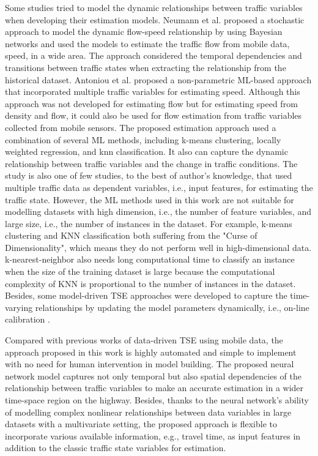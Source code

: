 \documentclass[english]{kththesis}
\begin{document}
Some studies tried to model the dynamic relationships between traffic variables when developing their estimation models. Neumann et al. \cite{neumann_bayesian} proposed a stochastic approach to model the dynamic flow-speed relationship by using Bayesian networks and used the models to estimate the traffic flow from mobile data, speed, in a wide area. The approach considered the temporal dependencies and transitions between traffic states when extracting the relationship from the historical dataset. Antoniou et al. \cite{antoniou_ml_estimation} proposed a non-parametric ML-based approach that incorporated multiple traffic variables for estimating speed. Although this approach was not developed for estimating flow but for estimating speed from density and flow, it could also be used for flow estimation from traffic variables collected from mobile sensors. The proposed estimation approach used a combination of several ML methods, including k-means clustering, locally weighted regression, and \gls{knn} classification. It also can capture the dynamic relationship between traffic variables and the change in traffic conditions. The study is also one of few studies, to the best of author's knowledge, that used multiple traffic data as dependent variables, i.e., input features, for estimating the traffic state. However, the ML methods used in this work are not suitable for modelling datasets with high dimension, i.e., the number of feature variables, and large size, i.e., the number of instances in the dataset. For example, k-means clustering and KNN classification both suffering from the "Curse of Dimensionality", which means they do not perform well in high-dimensional data. k-nearest-neighbor also needs long computational time to classify an instance when the size of the training dataset is large because the computational complexity of KNN is proportional to the number of instances in the dataset. Besides, some model-driven TSE approaches were developed to capture the time-varying relationships by updating the model parameters dynamically, i.e., on-line calibration \cite{nguyen_online_calibration_fd_model, wang_tse_online_calibration}.

Compared with previous works of data-driven TSE using mobile data, the approach proposed in this work is highly automated and simple to implement with no need for human intervention in model building. The proposed neural network model captures not only temporal but also spatial dependencies of the relationship between traffic variables to make an accurate estimation in a wider time-space region on the highway. Besides, thanks to the neural network's ability of modelling complex nonlinear relationships between data variables in large datasets with a multivariate setting, the proposed approach is flexible to incorporate various available information, e.g., travel time, as input features in addition to the classic traffic state variables for estimation.
\end{document}
